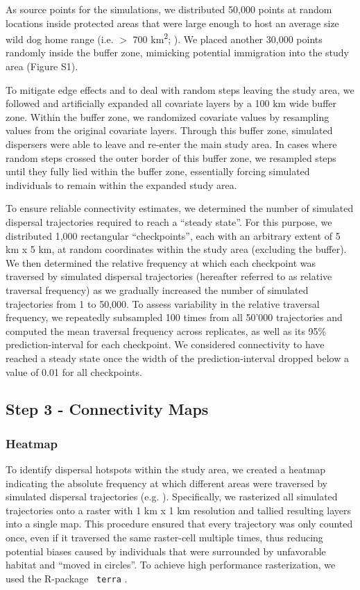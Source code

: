 \documentclass[abstract=on,10pt,a4paper,bibliography=totocnumbered]{article}
\begin{document}
As source points for the simulations, we distributed 50,000 points at random
locations inside protected areas that were large enough to host an average size
wild dog home range (i.e. \(>\) 700 km\textsuperscript{2};
\citealp{Pomilia.2015}). We placed another 30,000 points randomly inside the
buffer zone, mimicking potential immigration into the study area (Figure S1).

To mitigate edge effects and to deal with random steps leaving the study area,
we followed \cite{Koen.2010} and artificially expanded all covariate layers by a
100 km wide buffer zone. Within the buffer zone, we randomized covariate values
by resampling values from the original covariate layers. Through this buffer
zone, simulated dispersers were able to leave and re-enter the main study area.
In cases where random steps crossed the outer border of this buffer zone, we
resampled steps until they fully lied within the buffer zone, essentially
forcing simulated individuals to remain within the expanded study area.

To ensure reliable connectivity estimates, we determined the number of simulated
dispersal trajectories required to reach a ``steady state''. For this purpose,
we distributed 1,000 rectangular ``checkpoints'', each with an arbitrary extent
of 5 km x 5 km, at random coordinates within the study area (excluding the
buffer). We then determined the relative frequency at which each checkpoint was
traversed by simulated dispersal trajectories (hereafter referred to as relative
traversal frequency) as we gradually increased the number of simulated
trajectories from 1 to 50,000. To assess variability in the relative traversal
frequency, we repeatedly subsampled 100 times from all 50'000 trajectories and
computed the mean traversal frequency across replicates, as well as its 95\%
prediction-interval for each checkpoint. We considered connectivity to have
reached a steady state once the width of the prediction-interval dropped below a
value of 0.01 for all checkpoints.

\subsection{Step 3 - Connectivity Maps}
\subsubsection{Heatmap}
To identify dispersal hotspots within the study area, we created a heatmap
indicating the absolute frequency at which different areas were traversed by
simulated dispersal trajectories (e.g. \citealp{Hauenstein.2019, Zeller.2020}).
Specifically, we rasterized all simulated trajectories onto a raster with 1 km x
1 km resolution and tallied resulting layers into a single map. This procedure
ensured that every trajectory was only counted once, even if it traversed the
same raster-cell multiple times, thus reducing potential biases caused by
individuals that were surrounded by unfavorable habitat and ``moved in
circles''. To achieve high performance rasterization, we used the R-package {\tt
terra} \citep{Hijmans.2021b}.
\end{document}
